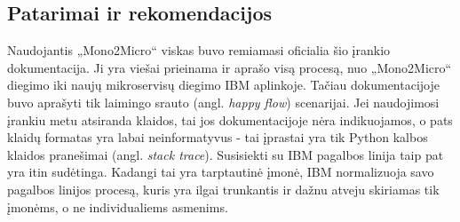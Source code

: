 \documentclass{VUMIFPSbakalaurinis}
\begin{document}
\subsection{Patarimai ir rekomendacijos} %
Naudojantis „Mono2Micro“ viskas buvo remiamasi oficialia šio įrankio dokumentacija. Ji yra viešai prieinama ir aprašo visą procesą, nuo „Mono2Micro“ diegimo iki naujų mikroservisų diegimo IBM aplinkoje. Tačiau dokumentacijoje buvo aprašyti tik laimingo srauto (angl. \emph{happy flow}) scenarijai. Jei naudojimosi įrankiu metu atsiranda klaidos, tai jos dokumentacijoje nėra indikuojamos, o pats klaidų formatas yra labai neinformatyvus - tai įprastai yra tik Python kalbos klaidos pranešimai (angl. \emph{stack trace}). Susisiekti su IBM pagalbos linija taip pat yra itin sudėtinga. Kadangi tai yra tarptautinė įmonė, IBM normalizuoja savo pagalbos linijos procesą, kuris yra ilgai trunkantis ir dažnu atveju skiriamas tik įmonėms, o ne individualiems asmenims.
\end{document}
